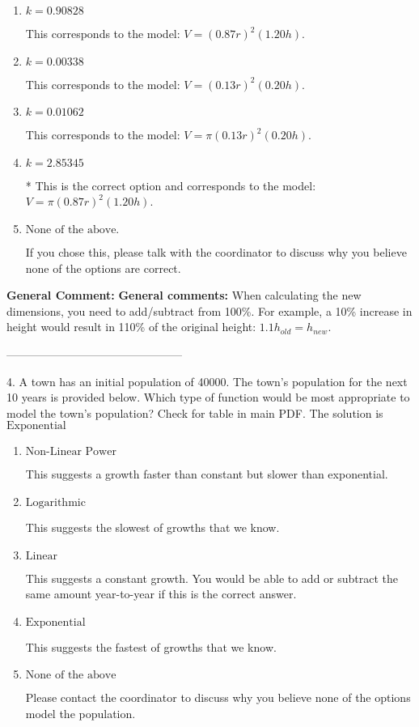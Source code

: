 \documentclass{extbook}[14pt]
\begin{document}
\begin{enumerate}[label=\Alph*.] 
\item $ k = 0.90828 $ 

 This corresponds to the model: $V = (0.87 r)^2 (1.20 h)$. 
\item $ k = 0.00338 $ 

 This corresponds to the model: $V = (0.13 r)^2 (0.20 h)$. 
\item $ k = 0.01062 $ 

 This corresponds to the model: $V = \pi (0.13 r)^2 (0.20 h)$. 
\item $ k = 2.85345 $ 

 * This is the correct option and corresponds to the model: $V = \pi (0.87 r)^2 (1.20 h)$. 
\item $ \text{None of the above.} $ 

 If you chose this, please talk with the coordinator to discuss why you believe none of the options are correct. 
\end{enumerate} 
 
\textbf{General Comment:} \textbf{General comments:} When calculating the new dimensions, you need to add/subtract from 100\%. For example, a 10\% increase in height would result in 110\% of the original height: $1.1h_{old} = h_{new}$. 

-----------------------------------------------

4. A town has an initial population of 40000. The town's population for the next 10 years is provided below. Which type of function would be most appropriate to model the town's population?
Check for table in main PDF. 
The solution is $ \text{Exponential} $ 

\begin{enumerate}[label=\Alph*.] 
\item $ \text{Non-Linear Power} $ 

 This suggests a growth faster than constant but slower than exponential. 
\item $ \text{Logarithmic} $ 

 This suggests the slowest of growths that we know. 
\item $ \text{Linear} $ 

 This suggests a constant growth. You would be able to add or subtract the same amount year-to-year if this is the correct answer. 
\item $ \text{Exponential} $ 

 This suggests the fastest of growths that we know. 
\item $ \text{None of the above} $ 

 Please contact the coordinator to discuss why you believe none of the options model the population. 
\end{enumerate} 
 
\end{document}
